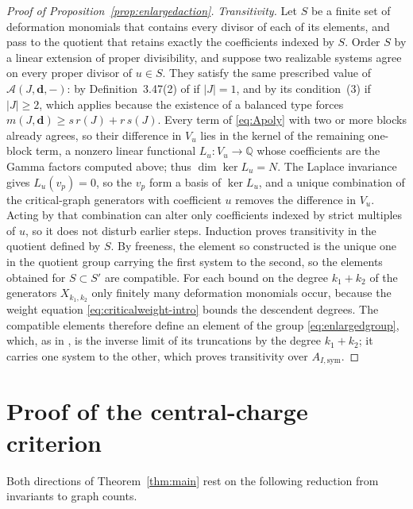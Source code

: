 \documentclass[11pt]{amsart}
\theoremstyle{definition}
\theoremstyle{remark}
\newcommand{\QQ}{\mathbb{Q}}
\begin{document}
\begin{proof}[Proof of Proposition~\ref{prop:enlargedaction}]
\emph{Transitivity.}  Let $S$ be a finite set of deformation monomials that
contains every divisor of each of its elements, and pass to the quotient that
retains exactly the coefficients indexed by $S$.  Order $S$ by a linear
extension of proper divisibility, and suppose two realizable systems agree on
every proper divisor of $u\in S$.  They satisfy the same prescribed value of
$\mathcal A(J,\mathbf d,-)$: by Definition~3.47(2) of \cite{GKT} if $|J|=1$,
and by its condition~(3) if $|J|\ge2$, which applies because the existence of
a balanced type forces $m(J,\mathbf d)\ge s\,r(J)+r\,s(J)$.  Every term of
\eqref{eq:Apoly} with two or more blocks already agrees, so their difference
in $V_u$ lies in the kernel of the remaining one-block term, a nonzero linear
functional $L_u:V_u\to\QQ$ whose coefficients are the Gamma factors computed
above; thus $\dim\ker L_u=N$.  The Laplace invariance gives $L_u(v_p)=0$, so
the $v_p$ form a basis of $\ker L_u$, and a unique combination of the
critical-graph generators with coefficient $u$ removes the difference in
$V_u$.  Acting by that combination can alter only coefficients indexed by
strict multiples of $u$, so it does not disturb earlier steps.  Induction
proves transitivity in the quotient defined by $S$.  By freeness, the element
so constructed is the unique one in the quotient group carrying the first
system to the second, so the elements obtained for $S\subset S'$ are
compatible.  For each bound on the degree $k_1+k_2$ of the generators $X_{k_1,k_2}$
only finitely many deformation monomials occur, because the weight equation
\eqref{eq:criticalweight-intro} bounds the descendent degrees.  The compatible
elements therefore define an element of the group \eqref{eq:enlargedgroup},
which, as in \cite[Def.~4.19]{GKT}, is the inverse limit of its truncations by
the degree $k_1+k_2$; it carries one system to the other, which proves
transitivity over $A_{I,\mathrm{sym}}$.
\end{proof}



\section{Proof of the central-charge criterion}
\label{sec:proof}

Both directions of Theorem~\ref{thm:main} rest on the following reduction from
invariants to graph counts.
\end{document}
